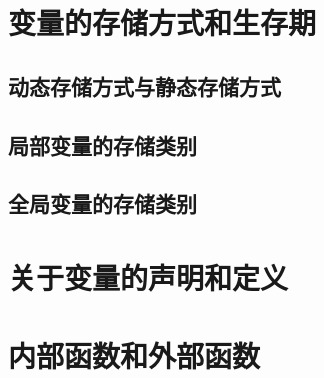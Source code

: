 \section{变量的存储方式和生存期}
\subsection{动态存储方式与静态存储方式}
\subsection{局部变量的存储类别}
\subsection{全局变量的存储类别}
\section{关于变量的声明和定义}
\section{内部函数和外部函数}

